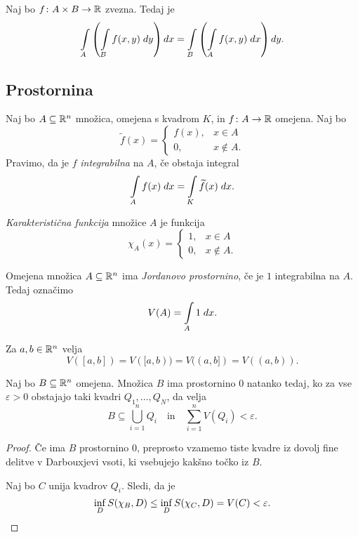 \begin{posledica}
Naj bo $f \colon A \times B \to \mathbb{R}$ zvezna. Tedaj je
\[
\int\limits_A \left(\int\limits_B f(x,y)\;dy\right) dx =
\int\limits_B \left(\int\limits_A f(x,y)\;dx\right) dy.
\]
\end{posledica}

\newpage

\subsection{Prostornina}

\begin{definicija}
Naj bo $A \subseteq \mathbb{R}^n$ množica, omejena s kvadrom $K$, in
$f \colon A \to \mathbb{R}$ omejena. Naj bo
\[
\widetilde{f}(x) = \begin{cases}
f(x), &x \in A
\\
0, &x \not \in A.
\end{cases}
\]
Pravimo, da je $f$ \emph{integrabilna} na $A$, če obstaja integral
\[
\int\limits_A f(x)\;dx = \int\limits_K \widetilde{f}(x)\;dx.
\]
\end{definicija}

\begin{definicija}
\emph{Karakteristična funkcija}
množice $A$ je funkcija
\[
\chi_A(x) = \begin{cases}
1, &x \in A
\\
0, &x \not \in A.
\end{cases}
\]
\end{definicija}

\begin{definicija}
Omejena množica $A \subseteq \mathbb{R}^n$ ima
\emph{Jordanovo prostornino}, če je
$1$ integrabilna na $A$. Tedaj označimo
\[
V(A) = \int\limits_A 1\;dx.
\]
\end{definicija}

\begin{opomba}
Za $a, b \in \mathbb{R}^n$ velja
\[
V([a,b]) = V([a,b)) = V((a,b]) = V((a,b)).
\]
\end{opomba}

\begin{trditev}
Naj bo $B \subseteq \mathbb{R}^n$ omejena. Množica $B$ ima prostornino $0$
natanko tedaj, ko za vse $\varepsilon > 0$ obstajajo taki kvadri
$Q_1,\dots,Q_N$, da velja
\[
B \subseteq \bigcup_{i=1}^n Q_i
\quad \text{in} \quad
\sum_{i=1}^n V(Q_i) < \varepsilon.
\]
\end{trditev}

\begin{proof}
Če ima $B$ prostornino $0$, preprosto vzamemo tiste kvadre iz
dovolj fine delitve v Darbouxjevi vsoti, ki vsebujejo kakšno točko
iz $B$.

Naj bo $C$ unija kvadrov $Q_i$. Sledi, da je
\[
\inf_D S(\chi_B,D) \leq \inf_D S(\chi_C,D) =  V(C) < \varepsilon.
\qedhere
\]
\end{proof}

